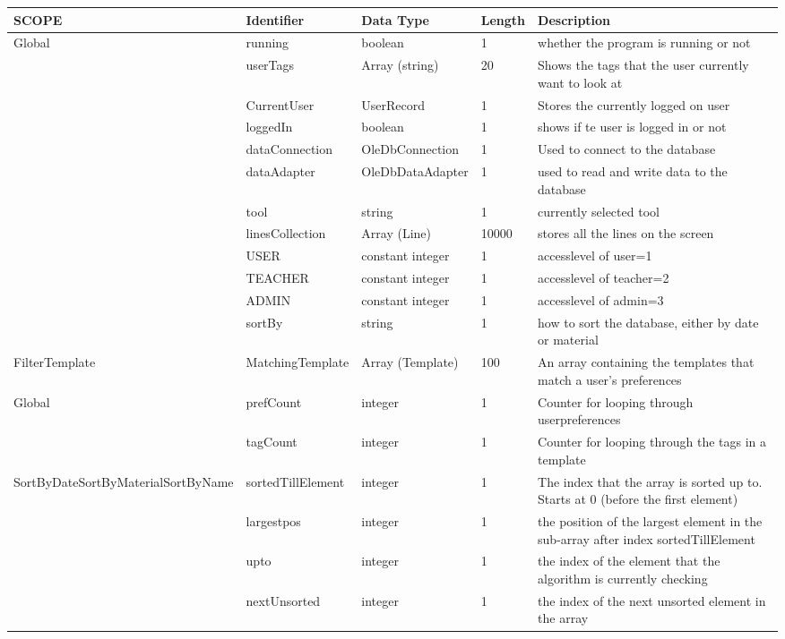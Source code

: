 \documentclass[oneside,openany,11pt,a4paper]{report}
\begin{document}


\begin{longtable}{|p{2cm}|p{3cm}|p{2cm}|p{1cm}|p{6cm}|}	
	
	\hline
	\rowcolor{gray!25}
	
	\small \textbf{SCOPE} & \small\textbf{Identifier}  & \small\textbf{Data Type} & \small\textbf{Length \footnotemark} & \small\textbf{Description} \\ \hline
	
	\multirow{12}{*}{\parbox{2cm}{Global}}
	& running & boolean & 1 & whether the program is running or not\\
	& userTags & Array (string) & 20 & Shows the tags that the user currently want to look at\\
	& CurrentUser & UserRecord & 1 & Stores the currently logged on user\\
	& loggedIn & boolean & 1 &shows if te user is logged in or not\\
	& dataConnection & OleDbConnection & 1 & Used to connect to the database\\
	& dataAdapter & OleDbDataAdapter & 1 & used to read and write data to the database\\
	& tool & string & 1 & currently selected tool\\
	& linesCollection & Array (Line) & 10000 & stores all the lines on the screen\\
	& USER & constant integer & 1 & accesslevel of user=1\\
	& TEACHER & constant integer & 1 & accesslevel of teacher=2\\
	& ADMIN & constant integer & 1 & accesslevel of admin=3\\
	& sortBy & string & 1 & how to sort the database, either by date or material \\ \hline
	
	FilterTemplate & MatchingTemplate & Array (Template) &100 & An array containing the templates that match a user's preferences \\ \hline
	
	\multirow{2}{*}{\parbox{2cm}{Global}}
	& prefCount & integer & 1 & Counter for looping through userpreferences\\
	& tagCount & integer &  1 & Counter for looping through the tags in a template\\ \hline
	\multirow{4}{*}{\parbox{2cm}{SortByDate\newline SortByMaterial\newline SortByName}}
		& sortedTillElement & integer & 1 & The index that the array is sorted up to. Starts at 0 (before the first element) \\
		& largestpos & integer & 1 & the position of the largest element in the sub-array after index sortedTillElement \\ 
		& upto & integer & 1 & the index of the element that the algorithm is currently checking \\
		& nextUnsorted & integer & 1 & the index of the next unsorted element in the array \\ \hline


\end{longtable}
\end{document}
